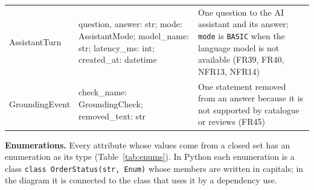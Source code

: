 {\begin{xltabular}{\textwidth}{@{}L{3.0cm} L{4.8cm} Y@{}}
\textsf{AssistantTurn} & question, answer: str; mode: AssistantMode; model\_name: str; latency\_ms: int; created\_at: datetime & One question to the AI assistant and its answer; \texttt{mode} is \texttt{BASIC} when the language model is not available (FR39, FR40, NFR13, NFR14) \\
\textsf{GroundingEvent} & check\_name: GroundingCheck; removed\_text: str & One statement removed from an answer because it is not supported by catalogue or reviews (FR45) \\
\end{xltabular}
}

\textbf{Enumerations.} Every attribute whose values come from a closed set has an enumeration as its type (Table~\ref{tab:enums}). In Python each enumeration is a class \texttt{class OrderStatus(str, Enum)} whose members are written in capitals; in the diagram it is connected to the class that uses it by a dependency \guillemotleft use\guillemotright.

